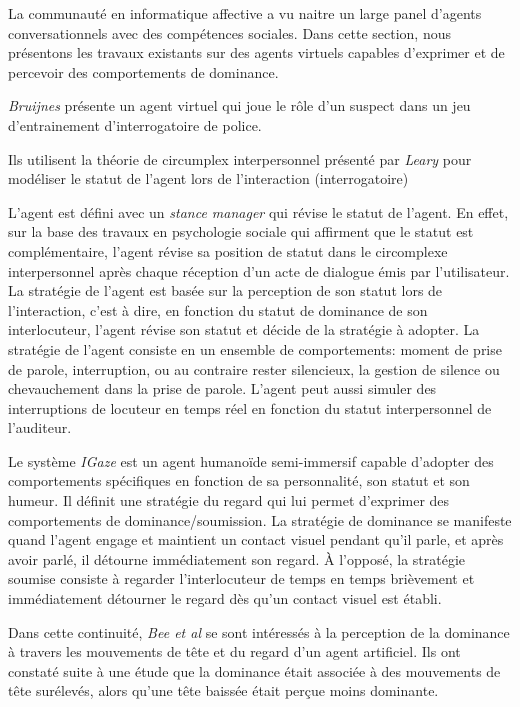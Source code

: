	La communauté en informatique affective a vu naitre un large panel d'agents conversationnels avec des compétences sociales. Dans cette section, nous présentons les travaux existants sur des agents virtuels capables d'exprimer et de percevoir des comportements de dominance. 
	
	\emph{Bruijnes} \cite{bruijnes2013affective} présente un agent virtuel qui joue le rôle d'un suspect dans un jeu d'entrainement  d'interrogatoire de police.
	
	Ils utilisent la théorie de circumplex interpersonnel présenté par \emph{Leary} \cite{leary2004interpersonal} pour modéliser le statut de l'agent lors de l'interaction (interrogatoire)
	
	L'agent est défini avec un \textit{stance manager} qui révise le statut de l'agent. En effet, sur la base des travaux en psychologie sociale qui affirment que le statut est complémentaire, l'agent révise sa position de statut dans le circomplexe interpersonnel après chaque réception d'un acte de dialogue émis par l'utilisateur. La stratégie de l'agent est basée sur la perception de son statut lors de l'interaction, c'est à dire, en fonction du statut de dominance de son interlocuteur, l'agent révise son statut et décide de la stratégie à adopter. La stratégie de l'agent consiste en un ensemble de comportements: moment de prise de parole, interruption, ou au contraire rester silencieux, la gestion de silence ou chevauchement dans la prise de parole. L'agent peut aussi simuler des interruptions de locuteur en temps réel en fonction du statut interpersonnel de l'auditeur.
	
		Le système \emph{IGaze}  \cite{kipp2008igaze} est un agent humanoïde semi-immersif capable d'adopter des comportements spécifiques en fonction de sa personnalité, son statut et son humeur. Il définit une stratégie du regard qui lui permet d'exprimer des comportements de dominance/soumission. La stratégie de dominance se manifeste quand l'agent engage et maintient un contact visuel pendant qu'il parle, et après avoir parlé, il détourne immédiatement son regard. À l'opposé, la stratégie soumise consiste à regarder l'interlocuteur de temps en temps brièvement et immédiatement détourner le regard dès qu'un contact visuel est établi. 
	
	Dans cette continuité, \emph{Bee et al} \cite{bee2009relations} se sont intéressés à la perception de la dominance à travers les mouvements de tête et du regard d'un agent artificiel. Ils ont constaté suite à une étude que la dominance était associée à des mouvements de tête surélevés, alors qu'une tête baissée était perçue moins dominante.
	
